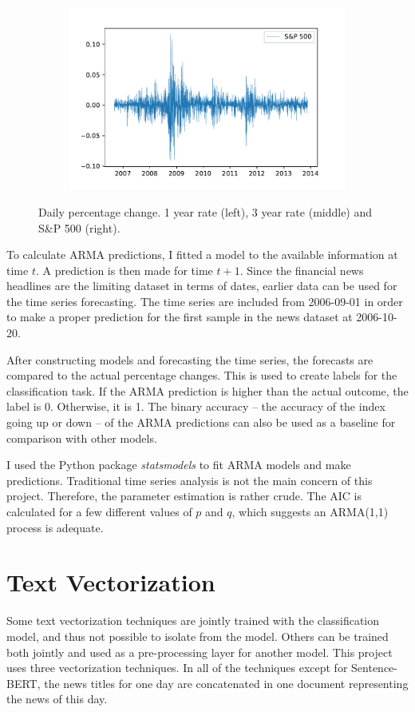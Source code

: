 \begin{figure}[H]
\begin{subfigure}[b]{0.32\textwidth}
    \includegraphics[width=\textwidth]{Figures/sp_pct.pdf}
    \end{subfigure}
    \caption{Daily percentage change. 1 year rate (left), 3 year rate (middle) and S\&P 500 (right).}
    \label{fig:pct_ts}
\end{figure}

To calculate ARMA predictions, I fitted a model to the available information at time $t$. A prediction is then made for time $t+1$. Since the financial news headlines are the limiting dataset in terms of dates, earlier data can be used for the time series forecasting. The time series are included from 2006-09-01 in order to make a proper prediction for the first sample in the news dataset at 2006-10-20. 

After constructing models and forecasting the time series, the forecasts are compared to the actual percentage changes. This is used to create labels for the classification task. If the ARMA prediction is higher than the actual outcome, the label is 0. Otherwise, it is 1. 
The binary accuracy -- the accuracy of the index going up or down -- of the ARMA predictions can also be used as a baseline for comparison with other models. 

I used the Python package \emph{statsmodels} to fit ARMA models and make predictions. Traditional time series analysis is not the main concern of this project. Therefore, the parameter estimation is rather crude. The AIC is calculated for a few different values of $p$ and $q$, which suggests an ARMA(1,1) process is adequate. 

\section{Text Vectorization}
Some text vectorization techniques are jointly trained with the classification model, and thus not possible to isolate from the model. Others can be trained both jointly and used as a pre-processing layer for another model. This project uses three vectorization techniques. In all of the techniques except for Sentence-BERT, the news titles for one day are concatenated in one document representing the news of this day. 

